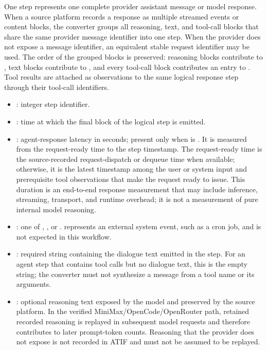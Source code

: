 \documentclass[11pt]{article}
\begin{document}
One  step represents one complete provider assistant message or model response.
When a source platform records a response as multiple streamed events or content blocks, the converter groups all reasoning, text, and tool-call blocks that share the same provider message identifier into one step.
When the provider does not expose a message identifier, an equivalent stable request identifier may be used.
The order of the grouped blocks is preserved: reasoning blocks contribute to , text blocks contribute to , and every tool-call block contributes an entry to .
Tool results are attached as observations to the same logical response step through their tool-call identifiers.

\begin{itemize}
  \item {}: integer step identifier.
  \item {}: time at which the final block of the logical step is emitted.
  \item {}: agent-response latency in seconds; present only when  is .
  It is measured from the request-ready time to the step timestamp.
  The request-ready time is the source-recorded request-dispatch or dequeue time when available; otherwise, it is the latest timestamp among the user or system input and prerequisite tool observations that make the request ready to issue.
  This duration is an end-to-end response measurement that may include inference, streaming, transport, and runtime overhead; it is not a measurement of pure internal model reasoning.
  \item {}: one of , , or .  represents an external system event, such as a cron job, and is not expected in this workflow.
  \item {}: required string containing the dialogue text emitted in the step. For an agent step that contains tool calls but no dialogue text, this is the empty string; the converter must not synthesize a message from a tool name or its arguments.
  \item {}: optional reasoning text exposed by the model and preserved by the source platform.
  In the verified MiniMax/OpenCode/OpenRouter path, retained recorded reasoning is replayed in subsequent model requests and therefore contributes to later prompt-token counts.
  Reasoning that the provider does not expose is not recorded in ATIF and must not be assumed to be replayed.

\end{itemize}
\end{document}
